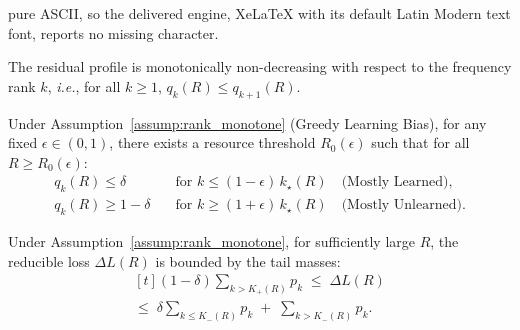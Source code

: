 \documentclass[10pt,a4paper]{amsart}
\begin{document}
pure ASCII, so the delivered engine, XeLaTeX with its default Latin Modern text font, reports no missing character.
\begin{assumption}
    \label{assump:rank_monotone}
    The residual profile is monotonically non-decreasing with respect to the frequency rank $k$, \textit{i.e.}, for all $k \geq 1$, $q_k(R) \le q_{k+1}(R).$
\end{assumption}

\begin{lemma}
\label{lem:step_surrogate}
Under Assumption~\ref{assump:rank_monotone} (Greedy Learning Bias), for any fixed $\epsilon\in(0,1)$, there exists a resource threshold $R_0(\epsilon)$ such that for all $R\ge R_0(\epsilon)$:
\begin{equation*}
\begin{aligned}
q_k(R) \le \delta \quad &\text{for } k \le (1-\epsilon)\,k_\star(R) \quad \text{(Mostly Learned)},\\
q_k(R) \ge 1-\delta \quad &\text{for } k \ge (1+\epsilon)\,k_\star(R) \quad \text{(Mostly Unlearned)}.
\end{aligned}
\end{equation*}
\end{lemma}

\begin{lemma}
\label{lem:sandwich}
Under Assumption~\ref{assump:rank_monotone}, for sufficiently large $R$, the reducible loss $\Delta L(R)$ is bounded by the tail masses:
\begin{equation}
\label{eq:sandwich_bounds}
\begin{multlined}[t]
(1-\delta)\sum_{k>K_{+}(R)} p_k \;\le\; \Delta L(R) \\
\le\; \delta\sum_{k\le K_{-}(R)} p_k \;+\; \sum_{k>K_{-}(R)} p_k .
\end{multlined}
\end{equation}
\end{lemma}
\end{document}
